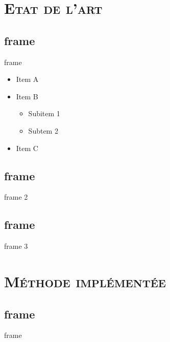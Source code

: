 \documentclass[xcolor=x11names,compress]{beamer}
\renewcommand{\(}{\begin{columns}} \renewcommand{\)}{\end{columns}}
\newcommand{\<}[1]{\begin{column}{#1}} \renewcommand{\>}{\end{column}}
\begin{document}
\section{\scshape Etat de l'art}
\subsection{frame}
\begin{frame}{frame}
  \begin{itemize}
  \item Item A
  \item Item B
    \begin{itemize}
    \item Subitem 1
    \item Subtem 2
    \end{itemize}
  \item Item C
  \end{itemize}
\end{frame}

\subsection{frame}
\begin{frame}{frame 2}

\end{frame}

\subsection{frame}
\begin{frame}{frame 3}

\end{frame}


\section{\scshape Méthode implémentée}
\subsection{frame}
\begin{frame}{frame}

\end{frame}
\end{document}
